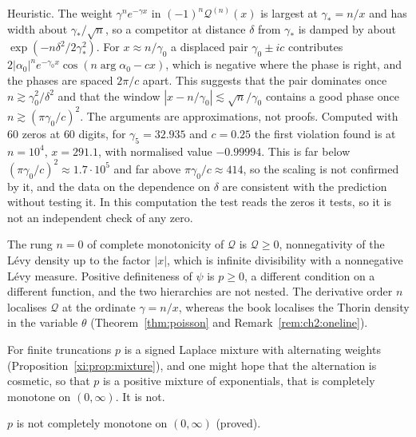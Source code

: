 \begin{remark}\label{xi:rem:scaling}
Heuristic. The weight $\gamma^ne^{-\gamma x}$ in $(-1)^n\mathcal Q^{(n)}(x)$ is largest at $\gamma_*=n/x$ and has width about $\gamma_*/\sqrt n$, so a competitor at distance $\delta$ from $\gamma_*$ is damped by about $\exp(-n\delta^2/2\gamma_*^2)$. For $x\approx n/\gamma_0$ a displaced pair $\gamma_0\pm ic$ contributes $2|\alpha_0|^ne^{-\gamma_0x}\cos(n\arg\alpha_0-cx)$, which is negative where the phase is right, and the phases are spaced $2\pi/c$ apart. This suggests that the pair dominates once $n\gtrsim\gamma_0^2/\delta^2$ and that the window $|x-n/\gamma_0|\lesssim\sqrt n/\gamma_0$ contains a good phase once $n\gtrsim(\pi\gamma_0/c)^2$. The arguments are approximations, not proofs. Computed with $60$ zeros at $60$ digits, for $\gamma_5=32.935$ and $c=0.25$ the first violation found is at $n=10^4$, $x=291.1$, with normalised value $-0.99994$. This is far below $(\pi\gamma_0/c)^2\approx1.7\cdot10^5$ and far above $\pi\gamma_0/c\approx414$, so the scaling is not confirmed by it, and the data on the dependence on $\delta$ are consistent with the prediction without testing it. In this computation the test reads the zeros it tests, so it is not an independent check of any zero.
\end{remark}

\begin{remark}\label{xi:rem:rungs}
The rung $n=0$ of complete monotonicity of $\mathcal Q$ is $\mathcal Q\ge0$, nonnegativity of the L\'evy density up to the factor $|x|$, which is infinite divisibility with a nonnegative L\'evy measure. Positive definiteness of $\psi$ is $p\ge0$, a different condition on a different function, and the two hierarchies are not nested. The derivative order $n$ localises $\mathcal Q$ at the ordinate $\gamma=n/x$, whereas the book localises the Thorin density in the variable $\theta$ (Theorem~\ref{thm:poisson} and Remark~\ref{rem:ch2:oneline}).
\end{remark}

For finite truncations $p$ is a signed Laplace mixture with alternating weights (Proposition~\ref{xi:prop:mixture}), and one might hope that the alternation is cosmetic, so that $p$ is a positive mixture of exponentials, that is completely monotone on $(0,\infty)$. It is not.

\begin{proposition}\label{xi:prop:notCM}
$p$ is not completely monotone on $(0,\infty)$ (proved).
\end{proposition}

